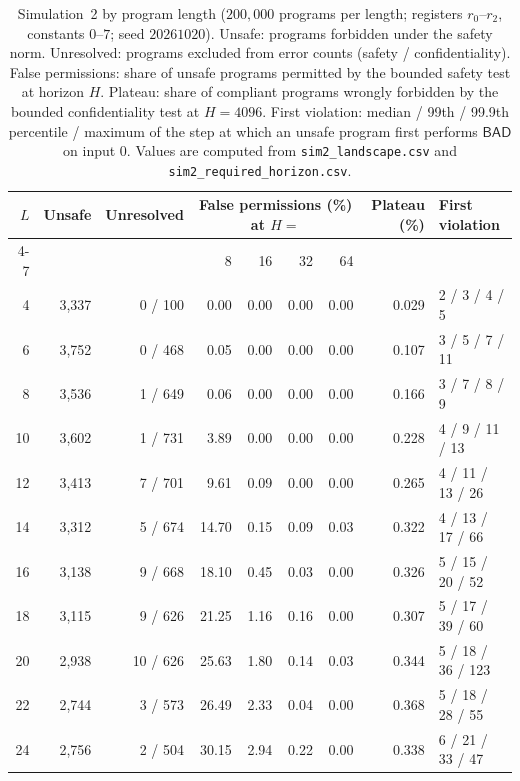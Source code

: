 \documentclass[11pt]{article}
\newcommand{\bad}{\mathsf{BAD}}
\begin{document}
\begin{table}[htbp]
\centering\small
\caption{Simulation~2 by program length ($200{,}000$ programs per length; registers $r_0$--$r_2$, constants $0$--$7$; seed $20261020$). Unsafe: programs forbidden under the safety norm. Unresolved: programs excluded from error counts (safety / confidentiality). False permissions: share of unsafe programs permitted by the bounded safety test at horizon $H$. Plateau: share of compliant programs wrongly forbidden by the bounded confidentiality test at $H=4096$. First violation: median / 99th / 99.9th percentile / maximum of the step at which an unsafe program first performs $\bad$ on input $0$. Values are computed from \texttt{sim2\_landscape.csv} and \texttt{sim2\_required\_horizon.csv}.}
\label{tab:S1sim2}
\begin{tabular}{rrrrrrrrl}
\toprule
$L$ & Unsafe & Unresolved & \multicolumn{4}{c}{False permissions (\%) at $H=$} & Plateau (\%) & First violation\\
\cmidrule(lr){4-7}
 & & & 8 & 16 & 32 & 64 & & \\
\midrule
4 & 3{,}337 & 0 / 100 & 0.00 & 0.00 & 0.00 & 0.00 & 0.029 & 2 / 3 / 4 / 5\\
6 & 3{,}752 & 0 / 468 & 0.05 & 0.00 & 0.00 & 0.00 & 0.107 & 3 / 5 / 7 / 11\\
8 & 3{,}536 & 1 / 649 & 0.06 & 0.00 & 0.00 & 0.00 & 0.166 & 3 / 7 / 8 / 9\\
10 & 3{,}602 & 1 / 731 & 3.89 & 0.00 & 0.00 & 0.00 & 0.228 & 4 / 9 / 11 / 13\\
12 & 3{,}413 & 7 / 701 & 9.61 & 0.09 & 0.00 & 0.00 & 0.265 & 4 / 11 / 13 / 26\\
14 & 3{,}312 & 5 / 674 & 14.70 & 0.15 & 0.09 & 0.03 & 0.322 & 4 / 13 / 17 / 66\\
16 & 3{,}138 & 9 / 668 & 18.10 & 0.45 & 0.03 & 0.00 & 0.326 & 5 / 15 / 20 / 52\\
18 & 3{,}115 & 9 / 626 & 21.25 & 1.16 & 0.16 & 0.00 & 0.307 & 5 / 17 / 39 / 60\\
20 & 2{,}938 & 10 / 626 & 25.63 & 1.80 & 0.14 & 0.03 & 0.344 & 5 / 18 / 36 / 123\\
22 & 2{,}744 & 3 / 573 & 26.49 & 2.33 & 0.04 & 0.00 & 0.368 & 5 / 18 / 28 / 55\\
24 & 2{,}756 & 2 / 504 & 30.15 & 2.94 & 0.22 & 0.00 & 0.338 & 6 / 21 / 33 / 47\\
\bottomrule
\end{tabular}
\end{table}
\end{document}
